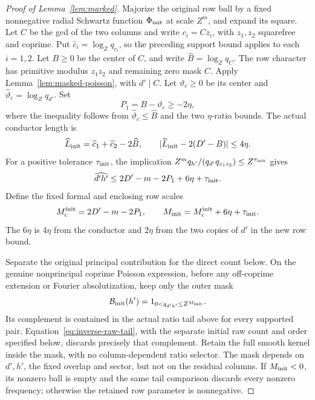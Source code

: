 \documentclass[12pt]{article}
\begin{document}
\begin{proof}[Proof of Lemma~\ref{lem:marked}]
Majorize the original row ball by a fixed nonnegative radial Schwartz
function \(\Phi_{\rm init}\) at scale \(Z^m\), and expand its square.  Let \(C\) be the gcd
of the two columns and write \(c_i=Cz_i\), with \(z_1,z_2\) squarefree
and coprime.  Put \(\widehat c_i=\log_Zq_{c_i}\), so the preceding
support bound applies to each \(i=1,2\).  Let \(B\ge0\) be the center of \(C\), and write
\(\widehat B=\log_Zq_C\).  The row character has primitive modulus
\(z_1z_2\) and remaining zero mask \(C\).  Apply
Lemma~\ref{lem:masked-poisson}, with \(d'\mid C\).  Let \(\vartheta_c\ge0\)
be its center and \(\widehat\vartheta_c=\log_Zq_{d'}\).  Set
\[
 P_1=B-\vartheta_c\ge-2\eta,
\]
where the inequality follows from \(\widehat\vartheta_c\le\widehat B\) and
the two \(\eta\)-ratio bounds.  The actual conductor length is
\[
 \widehat L_{\rm init}=\widehat c_1+\widehat c_2-2\widehat B,
 \qquad |\widehat L_{\rm init}-2(D'-B)|\le4\eta.
\]
For a positive tolerance \(\tau_{\rm init}\), the implication
\(Z^mq_{h'}/(q_{d'}q_{z_1z_2})\le Z^{\tau_{\rm init}}\) gives
\[
 \widehat{d'h'}\le2D'-m-2P_1+6\eta+\tau_{\rm init}.
\]
Define the fixed formal and enclosing row scales
\begin{equation}\label{eq:inverse-initial-row}
 M_c^{\rm init}=2D'-m-2P_1,\qquad
 M_{\rm init}=M_c^{\rm init}+6\eta+\tau_{\rm init}.
\end{equation}
The \(6\eta\) is \(4\eta\) from the conductor and \(2\eta\) from the
two copies of \(d'\) in the new row bound.

Separate the original principal contribution for the direct count below.
On the genuine nonprincipal coprime Poisson expression, before any
off-coprime extension or Fourier absolutization, keep only the outer mask
\[
 \mathcal B_{\rm init}(h')=1_{0<q_{d'h'}\le Z^{M_{\rm init}}}.
\]
Its complement is contained in the actual ratio tail above for every
supported pair.  Equation~\eqref{eq:inverse-raw-tail}, with the separate
initial raw count and order specified below, discards precisely that
complement.  Retain the full smooth kernel inside the mask, with no
column-dependent ratio selector.  The mask depends on \(d',h'\), the
fixed overlap and sector, but not on the residual columns.  If
\(M_{\rm init}<0\), its nonzero ball is empty and the same tail comparison
discards every nonzero frequency; otherwise the retained row parameter is
nonnegative.


\end{proof}
\end{document}
